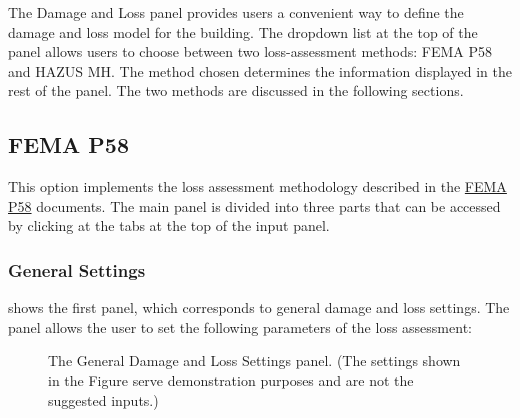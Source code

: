 The Damage and Loss panel provides users a convenient way to define the damage and loss model for the building. The dropdown list at the top of the panel allows users to choose between two loss-assessment methods: FEMA P58 and HAZUS MH. The method chosen determines the information displayed in the rest of the panel. The two methods are discussed in the following sections.

\subsection{FEMA P58}

This option implements the loss assessment methodology described in the \href{https://www.fema.gov/media-library/assets/documents/90380}{FEMA P58} documents. The main panel is divided into three parts that can be accessed by clicking at the tabs at the top of the input panel.

\subsubsection{General Settings}

 shows the first panel, which corresponds to general damage and loss settings. The panel allows the user to set the following parameters of the loss assessment:

\begin{figure}[!htbp]
  \caption{The General Damage and Loss Settings panel. (The settings shown in the Figure serve demonstration purposes and are not the suggested inputs.)}
  \label{fig:dl_p58_general}
\end{figure}

